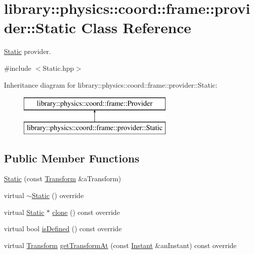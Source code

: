 \hypertarget{classlibrary_1_1physics_1_1coord_1_1frame_1_1provider_1_1_static}{}\section{library\+:\+:physics\+:\+:coord\+:\+:frame\+:\+:provider\+:\+:Static Class Reference}
\label{classlibrary_1_1physics_1_1coord_1_1frame_1_1provider_1_1_static}


\hyperlink{classlibrary_1_1physics_1_1coord_1_1frame_1_1provider_1_1_static}{Static} provider.  




{\ttfamily \#include $<$Static.\+hpp$>$}

Inheritance diagram for library\+:\+:physics\+:\+:coord\+:\+:frame\+:\+:provider\+:\+:Static\+:\begin{figure}[H]
\begin{center}
\leavevmode
\includegraphics[height=2.000000cm]{classlibrary_1_1physics_1_1coord_1_1frame_1_1provider_1_1_static}
\end{center}
\end{figure}
\subsection*{Public Member Functions}
\begin{DoxyCompactItemize}
\item 
\hyperlink{classlibrary_1_1physics_1_1coord_1_1frame_1_1provider_1_1_static_a2cc2ad821e2c251fe505439551b634fc}{Static} (const \hyperlink{classlibrary_1_1physics_1_1coord_1_1_transform}{Transform} \&a\+Transform)
\item 
virtual \hyperlink{classlibrary_1_1physics_1_1coord_1_1frame_1_1provider_1_1_static_ac2eedd75deffe49efa2de7ccf22f4a4a}{$\sim$\+Static} () override
\item 
virtual \hyperlink{classlibrary_1_1physics_1_1coord_1_1frame_1_1provider_1_1_static}{Static} $\ast$ \hyperlink{classlibrary_1_1physics_1_1coord_1_1frame_1_1provider_1_1_static_aa9062e601039a575302ea34e87e4dedc}{clone} () const override
\item 
virtual bool \hyperlink{classlibrary_1_1physics_1_1coord_1_1frame_1_1provider_1_1_static_a508f20f859dbc43759ab64e03b5befa1}{is\+Defined} () const override
\item 
virtual \hyperlink{classlibrary_1_1physics_1_1coord_1_1_transform}{Transform} \hyperlink{classlibrary_1_1physics_1_1coord_1_1frame_1_1provider_1_1_static_a0999bb357a22d2e626aeaae81031fd46}{get\+Transform\+At} (const \hyperlink{classlibrary_1_1physics_1_1time_1_1_instant}{Instant} \&an\+Instant) const override
\end{DoxyCompactItemize}


